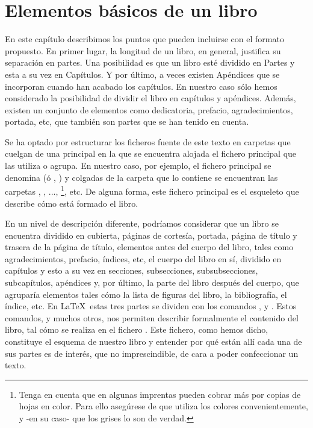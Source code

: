 \section{Elementos básicos de un libro}
%
En este capítulo describimos los puntos que pueden incluirse con el formato propuesto. En primer lugar, la longitud de un libro, en general, justifica su separación en partes. Una posibilidad es que un libro esté dividido en Partes y esta a su vez en Capítulos. Y por último, a veces existen Apéndices que se incorporan cuando han acabado los capítulos. En nuestro caso sólo hemos considerado la posibilidad de dividir el libro en capítulos y apéndices. Además, existen un conjunto de elementos como dedicatoria, prefacio, agradecimientos, portada, etc, que también son partes que se han tenido en cuenta. 

Se ha optado por estructurar los ficheros fuente de este texto en carpetas que cuelgan de una principal en la que se encuentra alojada el fichero principal que las utiliza o agrupa. En nuestro caso, por ejemplo, el fichero principal se denomina  (ó , ) y colgadas de la carpeta que lo contiene se encuentran las carpetas , , ..., \footnote{Tenga en cuenta que en algunas imprentas pueden cobrar más por copias de hojas en color. Para ello asegúrese de que utiliza los colores convenientemente, y -en su caso- que los grises lo son de verdad.}, etc. De alguna forma, este fichero principal es el esqueleto que describe cómo está formado el libro.

En un nivel de descripción diferente, podríamos considerar que un libro se encuentra dividido en cubierta, páginas de cortesía, portada, página de título y trasera de la página de título, elementos antes del cuerpo del libro, tales como agradecimientos, prefacio, índices, etc, el cuerpo del libro en sí, dividido en capítulos y esto a su vez en secciones, subsecciones, subsubsecciones, %
subcapítulos, apéndices y, por último, la parte del libro después del cuerpo, que agruparía elementos tales cómo la lista de figuras del libro, la bibliografía, el índice, etc. En \LaTeX\ estas tres partes se dividen con los comandos  ,  y . Estos comandos, y muchos otros, nos permiten describir formalmente el contenido del libro, tal cómo se realiza en el fichero . Este fichero, como hemos dicho, constituye el esquema de nuestro libro y entender por qué están allí cada una de sus partes es de interés, que no imprescindible, de cara a poder confeccionar un texto. 


